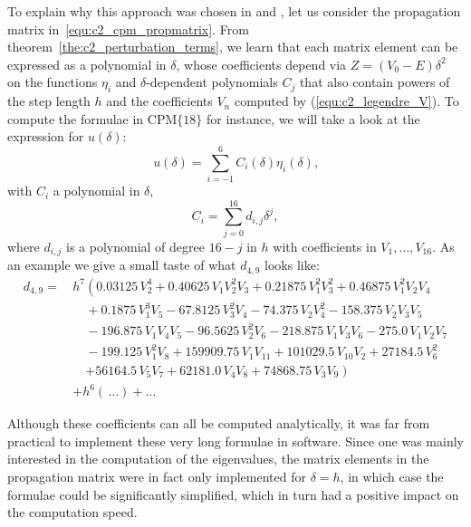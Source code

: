 To explain why this approach was chosen in \matslise{} and , let us consider the propagation matrix in~\eqref{equ:c2_cpm_propmatrix}. From theorem~\ref{the:c2_perturbation_terms}, we learn that each matrix element can be expressed as a polynomial in $\delta$, whose coefficients depend
via $Z=(V_0-E) \delta^2$ on the functions $\eta_i$ and $\delta$-dependent polynomials $C_j$ that also contain powers of the step length $h$ and the coefficients $V_n$ computed by (\ref{equ:c2_legendre_V}). To compute the formulae in $\text{CPM}\{18\}$ for instance, we will take a look at the expression for $u(\delta)$:
$$
    u(\delta) = \sum_{i = -1}^6 C_i(\delta) \eta_{i}(\delta)\text{,}
$$
with $C_i$ a polynomial in $\delta$,
$$
    C_i  = \sum_{j=0}^{16} d_{i, j} \delta^j,
$$
where $d_{i, j}$ is a polynomial of degree $16-j$ in $h$ with coefficients in $V_1, \dots, V_{16}$. As an example we give a small taste of what $d_{4, 9}$ looks like:
\begin{align*}
    d_{4, 9} =\,&  h^7 \left (0.03125 \, V_{2}^{4} + 0.40625 \, V_{1} V_{2}^{2} V_{3} + 0.21875 \, V_{1}^{2} V_{3}^{2} + 0.46875 \, V_{1}^{2} V_{2} V_{4} \right. \\
      & \quad + 0.1875 \, V_{1}^{3} V_{5} - 67.8125 \, V_{3}^{2} V_{4} - 74.375 \, V_{2} V_{4}^{2} - 158.375 \, V_{2} V_{3} V_{5}         \\
      & \quad - 196.875 \, V_{1} V_{4} V_{5} - 96.5625 \, V_{2}^{2} V_{6} - 218.875 \, V_{1} V_{3} V_{6} - 275.0 \, V_{1} V_{2} V_{7}     \\
      & \quad - 199.125 \, V_{1}^{2} V_{8} + 159909.75 \, V_{1} V_{11} + 101029.5 \, V_{10} V_{2} + 27184.5 \, V_{6}^{2}                  \\
      & \quad \left.+ 56164.5 \, V_{5} V_{7} + 62181.0 \, V_{4} V_{8} + 74868.75 \, V_{3} V_{9} \right)                                                 \\
     & + h^6 (\,\dots)  + \dots
\end{align*}

Although these coefficients can all be computed analytically, it was far from practical to implement these very long formulae in software. Since one was mainly interested in the computation of the eigenvalues, the matrix elements in the propagation matrix were in fact only implemented for $\delta=h$, in which case the formulae could be significantly simplified, which in turn had a positive impact on the computation speed.

